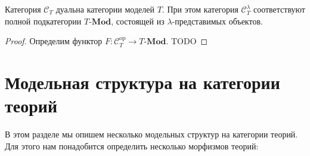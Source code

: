 \documentclass[reqno]{amsart}
\theoremstyle{definition}
\theoremstyle{remark}
\newcommand{\bcat}[1]{\mathbf{#1}}
\newcommand{\cat}[1]{\mathcal{#1}}
\newcommand{\Mod}[1]{#1\text{-}\bcat{Mod}}
\newcommand{\fs}[1]{\mathrm{#1}}
\begin{document}
\begin{prop}
Категория $\cat{C}_T$ дуальна категории моделей $T$.
При этом категория $\cat{C}_T^\lambda$ соответствуют полной подкатегории $\Mod{T}$, состоящей из $\lambda$-представимых объектов.
\end{prop}
\begin{proof}
Определим функтор $F : \cat{C}_T^\fs{op} \to \Mod{T}$.
TODO
\end{proof}

\section{Модельная структура на категории теорий}

В этом разделе мы опишем несколько модельных структур на категории теорий.
Для этого нам понадобится определить несколько морфизмов теорий:
\end{document}
